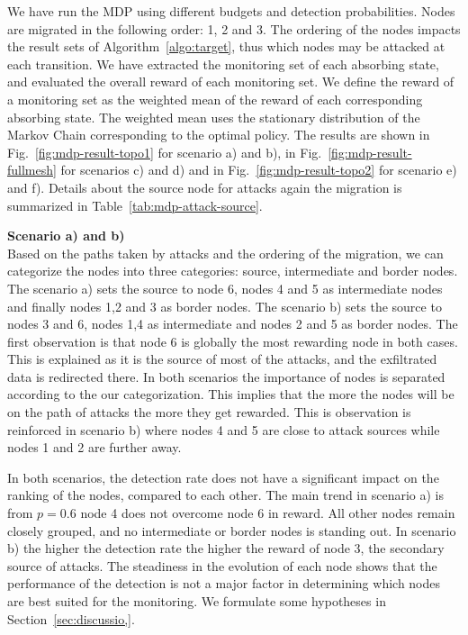 

We have run the MDP using different budgets and detection probabilities.
Nodes are migrated in the following order: 1, 2 and 3.
The ordering of the nodes impacts the result sets of Algorithm~\ref{algo:target}, thus which nodes may be attacked at each transition.
We have extracted the monitoring set of each absorbing state, and evaluated the overall reward of each monitoring set.
We define the reward of a monitoring set as the weighted mean of the reward of each corresponding absorbing state.
The weighted mean uses the stationary distribution of the Markov Chain corresponding to the optimal policy.
The results are shown in Fig.~\ref{fig:mdp-result-topo1} for scenario a) and b), in Fig.~\ref{fig:mdp-result-fullmesh} for scenarios c) and d) and in Fig.~\ref{fig:mdp-result-topo2} for scenario e) and f).
Details about the source node for attacks again the migration is summarized in Table~\ref{tab:mdp-attack-source}.



\textbf{Scenario a) and b)\\}
Based on the paths taken by attacks and the ordering of the migration, we can categorize the nodes into three categories: source, intermediate and border nodes.
The scenario a) sets the source to node 6, nodes 4 and 5 as intermediate nodes and finally nodes 1,2 and 3 as border nodes.
The scenario b) sets the source to nodes 3 and 6, nodes 1,4 as intermediate and nodes 2 and 5 as border nodes.
The first observation is that node 6 is globally the most rewarding node in both cases.
This is explained as it is the source of most of the attacks, and the exfiltrated data is redirected there.
In both scenarios the importance of nodes is separated according to the our categorization. 
This implies that the more the nodes will be on the path of attacks the more they get rewarded.
This is observation is reinforced in scenario b) where nodes 4 and 5 are close to attack sources while nodes 1 and 2 are further away.

In both scenarios, the detection rate does not have a significant impact on the ranking of the nodes, compared to each other.
The main trend in scenario a) is from $p=0.6$  node 4 does not overcome node 6 in reward. All other nodes remain closely grouped, and no intermediate or border nodes is standing out.
In scenario b) the higher the detection rate the higher the reward of node 3, the secondary source of attacks.
The steadiness in the evolution of each node shows that the performance of the detection is not a major factor in determining which nodes are best suited for the monitoring. We formulate some hypotheses in Section~\ref{sec:discussio,}.

